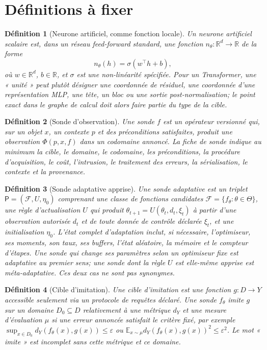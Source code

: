 \documentclass[11pt,a4paper,oneside]{report}
\newtheorem{definition}{Définition}[chapter]
\newcommand{\R}{\mathbb R}
\newcommand{\E}{\mathbb E}
\begin{document}
\section{Définitions à fixer}
\begin{definition}[Neurone artificiel, comme fonction locale]
Un neurone artificiel scalaire est, dans un réseau feed-forward standard, une fonction \(n_\theta:\R^d\to\R\) de la forme
\[
n_\theta(h)=\sigma(w^\top h+b),
\]
où \(w\in\R^d\), \(b\in\R\), et \(\sigma\) est une non-linéarité spécifiée. Pour un Transformer, une « unité » peut plutôt désigner une coordonnée de résiduel, une coordonnée d'une représentation MLP, une tête, un bloc ou une sortie post-normalisation; le point exact dans le graphe de calcul doit alors faire partie du type de la cible.
\end{definition}

\begin{definition}[Sonde d'observation]
Une sonde \(f\) est un opérateur versionné qui, sur un objet \(x\), un contexte \(p\) et des préconditions satisfaites, produit une observation \(\Phi(p,x,f)\) dans un codomaine annoncé. La fiche de sonde indique au minimum la cible, le domaine, le codomaine, les préconditions, la procédure d'acquisition, le coût, l'intrusion, le traitement des erreurs, la sérialisation, le contexte et la provenance.
\end{definition}

\begin{definition}[Sonde adaptative apprise]
Une sonde adaptative est un triplet \(\mathsf P=(\mathcal F, U, \eta_0)\) comprenant une classe de fonctions candidates \(\mathcal F=\{f_\theta:\theta\in\Theta\}\), une règle d'actualisation \(U\) qui produit \(\theta_{t+1}=U(\theta_t,d_t,\xi_t)\) à partir d'une observation autorisée \(d_t\) et de toute donnée de contrôle déclarée \(\xi_t\), et une initialisation \(\eta_0\). L'état complet d'adaptation inclut, si nécessaire, l'optimiseur, ses moments, son taux, ses buffers, l'état aléatoire, la mémoire et le compteur d'étapes. Une sonde qui change ses paramètres selon un optimiseur fixe est adaptative au premier sens; une sonde dont la règle \(U\) est elle-même apprise est méta-adaptative. Ces deux cas ne sont pas synonymes.
\end{definition}

\begin{definition}[Cible d'imitation]
Une cible d'imitation est une fonction \(g:D\to Y\) accessible seulement via un protocole de requêtes déclaré. Une sonde \(f_\theta\) imite \(g\) sur un domaine \(D_0\subseteq D\) relativement à une métrique \(d_Y\) et une mesure d'évaluation \(\mu\) si une erreur annoncée satisfait le critère fixé, par exemple \(\sup_{x\in D_0}d_Y(f_\theta(x),g(x))\leq\varepsilon\) ou \(\E_{x\sim\mu}d_Y(f_\theta(x),g(x))^2\leq\varepsilon^2\). Le mot « imite » est incomplet sans cette métrique et ce domaine.
\end{definition}
\end{document}
